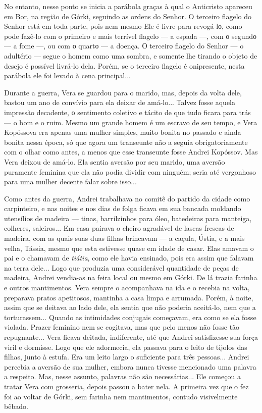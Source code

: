 No entanto, nesse ponto se inicia a parábola graças à qual o Anticristo
apareceu em Bor, na região de Górki, seguindo as ordens do Senhor. O
terceiro flagelo do Senhor está em toda parte, pois nem mesmo Ele é
livre para revogá-lо, como pode fazê-lo com o primeiro e mais terrível
flagelo --- a espada ---, com о segundо --- a fome ---, ou com о quartо
--- a doença. О terceirо flagelo do Senhor --- o adultério --- segue o
homem como uma sombra, e somente lhe tirando o objeto de desejo é
possível livrá-lo dela. Porém, se o terceiro flagelo é onipresente,
nesta parábola ele foi levado à cena principal...

Durante a guerra, Vera se guardou para o marido, mas, depois da volta
dele, bastou um ano de convívio para ela deixar de amá-lo... Talvez
fosse aquela impressão decadente, о sentimento coletivo e tácito de que
tudo ficara para trás --- o bom e o ruim. Mesmo um grande homem é um
escravo de seu tempo, e Vera Kopóssova era apenas uma mulher simples,
muito bonita no passado e ainda bonita nessa época, só que agora um
transeunte não a seguia obrigatoriamente com o olhar como antes, a menos
que esse transeunte fosse Andrei Kopóssov. Mas Vera deixou de amá-lo.
Ela sentia aversão por seu marido, uma aversão puramente feminina que
ela não podia dividir com ninguém; seria até vergonhoso para uma mulher
decente falar sobre isso...

Como antes da guerra, Andrei trabalhava no comitê do partido da cidade
como carpinteiro, e nas noites e nos dias de folga ficava em sua bancada
moldando utensílios de madeira --- tinas, barrilzinhos para óleo,
batedeiras para manteiga, colheres, saleiros... Em casa pairava o cheiro
agradável de lascas frescas de madeira, com as quais suas duas filhas
brincavam --- a caçula, Ústia, e a mais velha, Tássia, mesmo que esta
estivesse quase em idade de casar. Elas amavam o pai e o chamavam de
\emph{tiátia}, como ele havia ensinado, pois era assim que falavam na
terra dele... Logo que produzia uma considerável quantidade de peças de
madeira, Andrei vendia-as na feira local ou mesmo em Górki. De lá trazia
farinha e outros mantimentos. Vera sempre o acompanhava na ida e o
recebia na volta, preparava pratos apetitosos, mantinha a casa limpa e
arrumada. Porém, à noite, assim que se deitava ao lado dele, ela sentia
que não poderia aceitá-lo, nem que a torturassem... Quando as
intimidades conjugais começavam, era como se ela fosse violada. Prazer
feminino nem se cogitava, mas que pelo menos não fosse tão repugnante...
Vera ficava deitada, indiferente, até que Andrei satisfizesse sua força
viril e dormisse. Logo que ele adormecia, ela passava para o leito de
tijolos das filhas, junto à estufa. Era um leito largo o suficiente para
três pessoas... Andrei percebia a aversão de sua mulher, embora nunca
tivesse mencionado uma palavra a respeito. Mas, nesse assunto, palavras
não são necessárias... Ele começou a tratar Vera com grosseria, depois
passou a bater nela. A primeira vez que o fez foi ao voltar de Górki,
sem farinha nem mantimentos, contudo visivelmente bêbado.


